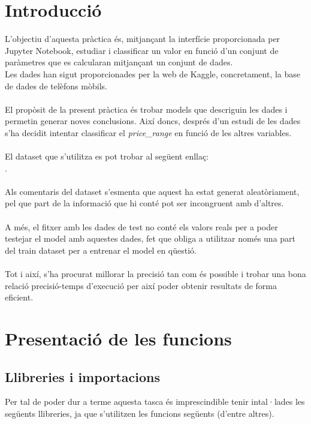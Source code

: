\documentclass[a4paper, 11pt]{article}
\begin{document}
\section{Introducció}
L'objectiu d'aquesta pràctica és, mitjançant la interfície proporcionada per Jupyter Notebook, estudiar i classificar un valor en funció d'un conjunt de paràmetres que es calcularan mitjançant un conjunt de dades. \\
Les dades han sigut proporcionades per la web de Kaggle, concretament, la base de dades de telèfons mòbils.\\\\
El propòsit de la present pràctica és trobar models que descriguin les dades i permetin generar noves conclusions. Així doncs, després d'un estudi de les dades s'ha decidit intentar classificar el \textit{price\_range} en funció de les altres variables.\\
\\
El dataset que s'utilitza es pot trobar al següent enllaç: \\ . \\\\
Als comentaris del dataset s'esmenta que aquest ha estat generat aleatòriament, pel que part de la informació que hi conté pot ser incongruent amb d'altres.\\\\
A més, el fitxer amb les dades de test no conté els valors reals per a poder testejar el model amb aquestes dades, fet que obliga a utilitzar només una part del train dataset per a entrenar el model en qüestió.\\\\
Tot i així, s'ha procurat millorar la precisió tan com és possible i trobar una bona relació precisió-temps d'execució per així poder obtenir resultats de forma eficient.
\newpage
\section{Presentació de les funcions}
\subsection{Llibreries i importacions}
Per tal de poder dur a terme aquesta tasca és imprescindible tenir intal·lades les següents llibreries, ja que s'utilitzen les funcions següents (d'entre altres).
\end{document}
